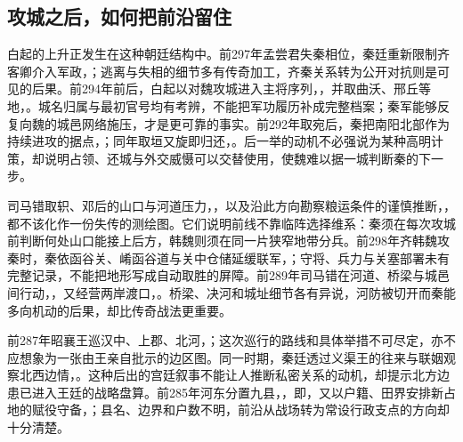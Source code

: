 \subsection{攻城之后，如何把前沿留住}

白起的上升正发生在这种朝廷结构中。前297年孟尝君失秦相位，秦廷重新限制齐客卿介入军政，；逃离与失相的细节多有传奇加工，齐秦关系转为公开对抗则是可见的后果。前294年前后，白起以对魏攻城进入主将序列，，并取曲沃、邢丘等地，。城名归属与最初官号均有考辨，不能把军功履历补成完整档案；秦军能够反复向魏的城邑网络施压，才是更可靠的事实。前292年取宛后，秦把南阳北部作为持续进攻的据点，；同年取垣又旋即归还，。后一举的动机不必强说为某种高明计策，却说明占领、还城与外交威慑可以交替使用，使魏难以据一城判断秦的下一步。

司马错取轵、邓后的山口与河道压力，，以及沿此方向勘察粮运条件的谨慎推断，，都不该化作一份失传的测绘图。它们说明前线不靠临阵选择维系：秦须在每次攻城前判断何处山口能接上后方，韩魏则须在同一片狭窄地带分兵。前298年齐韩魏攻秦时，秦依函谷关、崤函谷道与关中仓储延缓联军，；守将、兵力与关塞部署未有完整记录，不能把地形写成自动取胜的屏障。前289年司马错在河道、桥梁与城邑间行动，，又经营两岸渡口，。桥梁、决河和城址细节各有异说，河防被切开而秦能多向机动的后果，却比传奇战法更重要。

前287年昭襄王巡汉中、上郡、北河，；这次巡行的路线和具体举措不可尽定，亦不应想象为一张由王亲自批示的边区图。同一时期，秦廷透过义渠王的往来与联姻观察北西边情，。这种后出的宫廷叙事不能让人推断私密关系的动机，却提示北方边患已进入王廷的战略盘算。前285年河东分置九县，，即，又以户籍、田界安排新占地的赋役守备，；县名、边界和户数不明，前沿从战场转为常设行政支点的方向却十分清楚。


